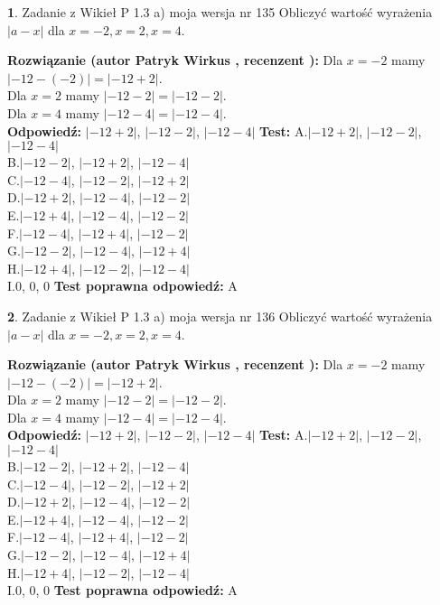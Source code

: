 \documentclass[12pt, a4paper]{article}
\theoremstyle{definition} %
\newtheorem{zad}{}
\newcommand{\zadStart}[1]{\begin{zad}#1\newline}
\newcommand{\zadStop}{\end{zad}}
\newcommand{\rozwStart}[2]{\noindent \textbf{Rozwiązanie (autor #1 , recenzent #2): }\newline}
\newcommand{\rozwStop}{\newline}
\newcommand{\odpStart}{\noindent \textbf{Odpowiedź:}\newline}
\newcommand{\odpStop}{\newline}
\newcommand{\testStart}{\noindent \textbf{Test:}\newline}
\newcommand{\testStop}{\newline}
\newcommand{\kluczStart}{\noindent \textbf{Test poprawna odpowiedź:}\newline}
\newcommand{\kluczStop}{\newline}
\begin{document}
\zadStart{Zadanie z Wikieł P 1.3 a) moja wersja nr 135}
Obliczyć wartość wyrażenia $|a - x|$ dla $x=-2,x=2,x=4$.
\zadStop
\rozwStart{Patryk Wirkus}{}
Dla $x = -2$ mamy $|-12 - (-2)| = |-12 + 2|$.\\
Dla $x = 2$ mamy $|-12 - 2| = |-12 - 2|$.\\
Dla $x = 4$ mamy $|-12 - 4| = |-12 - 4|$.\\
\rozwStop
\odpStart
$|-12 + 2|$, $|-12 - 2|$, $|-12 - 4|$
\odpStop
\testStart
A.$|-12 + 2|$, $|-12 - 2|$, $|-12 - 4|$\\
B.$|-12 - 2|$, $|-12 + 2|$, $|-12 - 4|$\\
C.$|-12 - 4|$, $|-12 - 2|$, $|-12 + 2|$\\
D.$|-12 + 2|$, $|-12 - 4|$, $|-12 - 2|$\\
E.$|-12 + 4|$, $|-12 - 4|$, $|-12 - 2|$\\
F.$|-12 - 4|$, $|-12 + 4|$, $|-12 - 2|$\\
G.$|-12 - 2|$, $|-12 - 4|$, $|-12 + 4|$\\
H.$|-12 + 4|$, $|-12 - 2|$, $|-12 - 4|$\\
I.$0$, $0$, $0$
\testStop
\kluczStart
A
\kluczStop



\zadStart{Zadanie z Wikieł P 1.3 a) moja wersja nr 136}
Obliczyć wartość wyrażenia $|a - x|$ dla $x=-2,x=2,x=4$.
\zadStop
\rozwStart{Patryk Wirkus}{}
Dla $x = -2$ mamy $|-12 - (-2)| = |-12 + 2|$.\\
Dla $x = 2$ mamy $|-12 - 2| = |-12 - 2|$.\\
Dla $x = 4$ mamy $|-12 - 4| = |-12 - 4|$.\\
\rozwStop
\odpStart
$|-12 + 2|$, $|-12 - 2|$, $|-12 - 4|$
\odpStop
\testStart
A.$|-12 + 2|$, $|-12 - 2|$, $|-12 - 4|$\\
B.$|-12 - 2|$, $|-12 + 2|$, $|-12 - 4|$\\
C.$|-12 - 4|$, $|-12 - 2|$, $|-12 + 2|$\\
D.$|-12 + 2|$, $|-12 - 4|$, $|-12 - 2|$\\
E.$|-12 + 4|$, $|-12 - 4|$, $|-12 - 2|$\\
F.$|-12 - 4|$, $|-12 + 4|$, $|-12 - 2|$\\
G.$|-12 - 2|$, $|-12 - 4|$, $|-12 + 4|$\\
H.$|-12 + 4|$, $|-12 - 2|$, $|-12 - 4|$\\
I.$0$, $0$, $0$
\testStop
\kluczStart
A
\kluczStop
\end{document}
